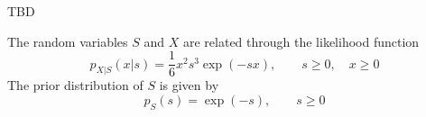 \ifspanish
TBD

\else

The random variables $S$ and $X$ are related through the likelihood function
\begin{equation*}
p_{X|S}(x|s) = \frac16 x ^2 s^3 \exp(-sx),    \qquad s \ge 0, \quad x \ge 0
\end{equation*}
The prior distribution of $S$ is given by
\begin{equation*}
p_{S}(s) = \exp(-s), \qquad  s \ge 0
\end{equation*}


